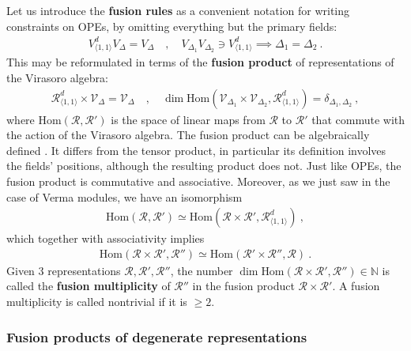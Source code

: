 \documentclass[12pt, a4paper]{article}
\newcommand{\myindex}[1]{\textbf{\boldmath #1}}
\theoremstyle{break}
\begin{document}
Let us introduce the \myindex{fusion rules} as a convenient notation for writing constraints on OPEs, by omitting everything but the primary fields:
\begin{align}
 V^d_{\langle 1,1\rangle} V_{\Delta} = V_\Delta \quad , \quad V_{\Delta_1} V_{\Delta_2} \ni V^d_{\langle 1,1\rangle} \implies \Delta_1=\Delta_2\ . 
\end{align}
This may be reformulated in terms of 
the \myindex{fusion product} of representations of the Virasoro algebra:
\begin{align}
 \mathcal{R}^d_{\langle 1,1\rangle} \times \mathcal{V}_\Delta = \mathcal{V}_\Delta \quad , \quad \dim\text{Hom}\left(\mathcal{V}_{\Delta_1}\times \mathcal{V}_{\Delta_2}, \mathcal{R}^d_{\langle 1,1\rangle}\right) = \delta_{\Delta_1,\Delta_2}\ ,
 \label{rtv}
\end{align}
where $\text{Hom}(\mathcal{R},\mathcal{R}')$ is the space of linear maps from $\mathcal{R}$ to $\mathcal{R}'$ that commute with the action of the Virasoro algebra. 
The fusion product can be algebraically defined \cite{gab99}. It differs from the tensor product, in particular its definition involves the fields' positions, although the resulting product does not. Just like OPEs, the fusion product is commutative and associative. Moreover, as we just saw in the case of Verma modules, we have an isomorphism
\begin{align}
 \text{Hom}\left(\mathcal{R},\mathcal{R}'\right) \simeq \text{Hom}\left(\mathcal{R}\times\mathcal{R}',\mathcal{R}^d_{\langle 1,1\rangle}\right)\ ,
\end{align}
which together with associativity implies 
\begin{align}
 \text{Hom}\left(\mathcal{R}\times\mathcal{R}',\mathcal{R}''\right) \simeq \text{Hom}\left(\mathcal{R}'\times\mathcal{R}'',\mathcal{R}\right)\ .
 \label{hrr}
\end{align}
Given 3 representations $\mathcal{R},\mathcal{R}',\mathcal{R}''$, the number $\dim \text{Hom}\left(\mathcal{R}\times\mathcal{R}',\mathcal{R}''\right) \in \mathbb{N}$ is called the \myindex{fusion multiplicity} of $\mathcal{R}''$ in the fusion product $\mathcal{R}\times\mathcal{R}'$. A fusion multiplicity is called nontrivial if it is $\geq 2$. 

\subsubsection{Fusion products of degenerate representations}
\end{document}

